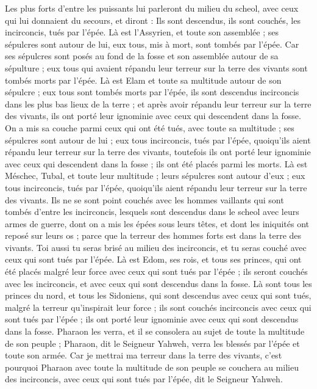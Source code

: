 \begin{multicols}{2}
Les plus forts d'entre les puissants lui parleront du milieu du scheol, avec ceux qui lui donnaient du secours, et diront : Ils sont descendus, ils sont couchés, les incirconcis, tués par l'épée.
Là est l'Assyrien, et toute son assemblée ; ses sépulcres sont autour de lui, eux tous, mis à mort, sont tombés par l'épée.
Car ses sépulcres sont posés au fond de la fosse et son assemblée autour de sa sépulture ; eux tous qui avaient répandu leur terreur sur la terre des vivants sont tombés morts par l'épée.
Là est Elam et toute sa multitude autour de son sépulcre ; eux tous sont tombés morts par l'épée, ils sont descendus incirconcis dans les plus bas lieux de la terre ; et après avoir répandu leur terreur sur la terre des vivants, ils ont porté leur ignominie avec ceux qui descendent dans la fosse.
On a mis sa couche parmi ceux qui ont été tués, avec toute sa multitude ; ses sépulcres sont autour de lui ; eux tous incirconcis, tués par l'épée, quoiqu'ils aient répandu leur terreur sur la terre des vivants, toutefois ils ont porté leur ignominie avec ceux qui descendent dans la fosse ; ils ont été placés parmi les morts.
Là est Méschec, Tubal, et toute leur multitude ; leurs sépulcres sont autour d'eux ; eux tous incirconcis, tués par l'épée, quoiqu'ils aient répandu leur terreur sur la terre des vivants.
Ils ne se sont point couchés avec les hommes vaillants qui sont tombés d'entre les incirconcis, lesquels sont descendus dans le scheol avec leurs armes de guerre, dont on a mis les épées sous leurs têtes, et dont les iniquités ont reposé sur leurs os ; parce que la terreur des hommes forts est dans la terre des vivants.
Toi aussi tu seras brisé au milieu des incirconcis, et tu seras couché avec ceux qui sont tués par l'épée.
Là est Edom, ses rois, et tous ses princes, qui ont été placés malgré leur force avec ceux qui sont tués par l'épée ; ils seront couchés avec les incirconcis, et avec ceux qui sont descendus dans la fosse.
Là sont tous les princes du nord, et tous les Sidoniens, qui sont descendus avec ceux qui sont tués, malgré la terreur qu'inspirait leur force ; ils sont couchés incirconcis avec ceux qui sont tués par l'épée ; ils ont porté leur ignominie avec ceux qui sont descendus dans la fosse.
Pharaon les verra, et il se consolera au sujet de toute la multitude de son peuple ; Pharaon, dit le Seigneur Yahweh, verra les blessés par l'épée et toute son armée.
Car je mettrai ma terreur dans la terre des vivants, c'est pourquoi Pharaon avec toute la multitude de son peuple se couchera au milieu des incirconcis, avec ceux qui sont tués par l'épée, dit le Seigneur Yahweh.

\end{multicols}
